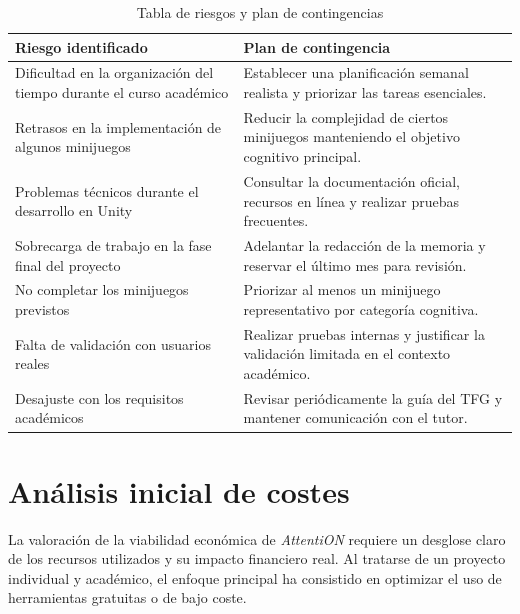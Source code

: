 \documentclass[12pt, a4paper]{report}
\begin{document}
\begin{table}[H]
\centering
\caption{Tabla de riesgos y plan de contingencias}
\label{tab:riesgos}
\renewcommand{\arraystretch}{1.3}
\begin{tabularx}{\textwidth}{|X|X|}
\hline
\textbf{Riesgo identificado} & \textbf{Plan de contingencia} \\
\hline
Dificultad en la organización del tiempo durante el curso académico &
Establecer una planificación semanal realista y priorizar las tareas esenciales. \\
\hline
Retrasos en la implementación de algunos minijuegos &
Reducir la complejidad de ciertos minijuegos manteniendo el objetivo cognitivo principal. \\
\hline
Problemas técnicos durante el desarrollo en Unity &
Consultar la documentación oficial, recursos en línea y realizar pruebas frecuentes. \\
\hline
Sobrecarga de trabajo en la fase final del proyecto &
Adelantar la redacción de la memoria y reservar el último mes para revisión. \\
\hline
No completar los minijuegos previstos &
Priorizar al menos un minijuego representativo por categoría cognitiva. \\
\hline
Falta de validación con usuarios reales &
Realizar pruebas internas y justificar la validación limitada en el contexto académico. \\
\hline
Desajuste con los requisitos académicos &
Revisar periódicamente la guía del TFG y mantener comunicación con el tutor. \\
\hline
\end{tabularx}
\end{table}

\section{Análisis inicial de costes}

La valoración de la viabilidad económica de \textit{AttentiON} requiere
un desglose claro de los recursos utilizados y su impacto financiero real.
Al tratarse de un proyecto individual y académico, el enfoque principal ha
consistido en optimizar el uso de herramientas gratuitas o de bajo coste.
\end{document}
